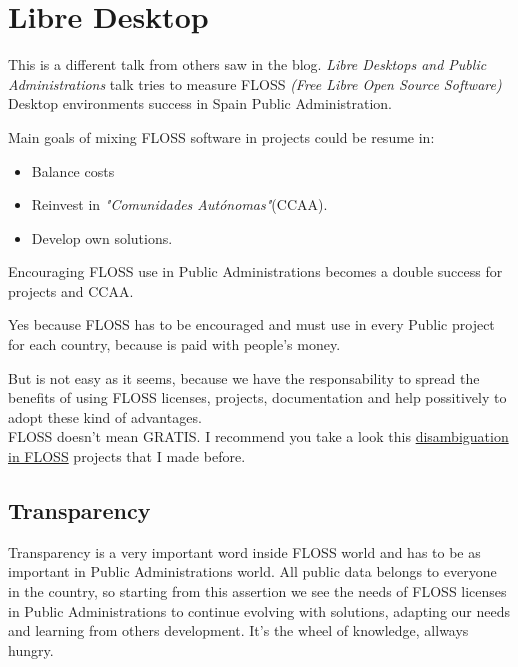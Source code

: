 \section{Libre Desktop}
\label{sec:libre-desktop}
 
\par This is a different talk from others saw in the blog. \textit{Libre Desktops and Public Administrations} talk tries to measure FLOSS \textit{(Free Libre Open Source Software)} Desktop environments success in Spain Public Administration.

\par Main goals of mixing FLOSS software in projects could be resume in:

\begin{itemize}
	\item Balance costs
	\item Reinvest in \textit{"Comunidades Autónomas"}(CCAA).
	\item Develop own solutions.
\end{itemize} Encouraging FLOSS use in Public Administrations becomes a double success for projects and CCAA. 

\par Yes because FLOSS has to be encouraged and must use in every Public project for each country, because is paid with people's money.

\par But is not easy as it seems, because we have the responsability to spread the benefits of using FLOSS licenses, projects, documentation and help possitively to adopt these kind of advantages.
\\ FLOSS doesn't mean GRATIS. I recommend you take a look this \href{http://mastersfwlurjc.blogspot.com.es/2012/11/errores-de-percepcion-del-software-libre.html}{disambiguation in FLOSS} projects that I made before.

\subsection{Transparency}

\par Transparency is a very important word inside FLOSS world and has to be as important in Public Administrations world. All public data belongs to everyone in the country, so starting from this assertion we see the needs of FLOSS licenses in Public Administrations to continue evolving with solutions, adapting our needs and learning from others development. It's the wheel of knowledge, allways hungry.

